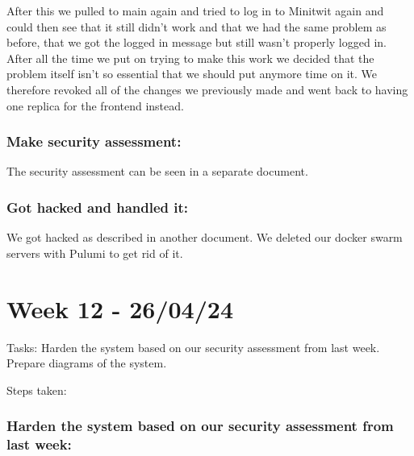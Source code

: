 After this we pulled to main again and tried to log in to Minitwit again and could then see that it still didn't work and that we had the same problem as before, that we got the logged in message but still wasn't properly logged in. After all the time we put on trying to make this work we decided that the problem itself isn't so essential that we should put anymore time on it. We therefore revoked all of the changes we previously made and went back to having one replica for the frontend instead.

\subsubsection{Make security assessment:}
\label{log:make-security-assessment}

The security assessment can be seen in a separate document.

\subsubsection{Got hacked and handled it:}
\label{log:got-hacked-and-handled-it}

We got hacked as described in another document. We deleted our docker
swarm servers with Pulumi to get rid of it.

\section{Week 12 - 26/04/24}
\label{week12}

Tasks: Harden the system based on our security assessment from last week. Prepare diagrams of the system.

Steps taken:

\subsubsection{Harden the system based on our security assessment from last week:}
\label{log:harden-the-system-based-on-our-security-assessment-from-last-week}

